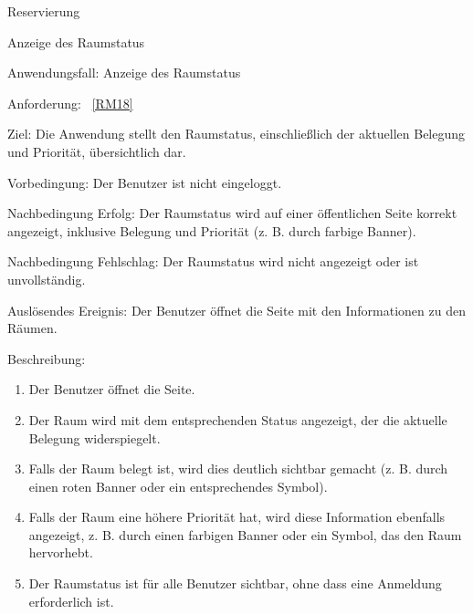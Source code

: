 \begin{function}{20}{Reservierung}
\begin{function}{70}{Anzeige des Raumstatus}
    \item[Anwendungsfall:] Anzeige des Raumstatus
    \item[Anforderung:] ~\ref{RM18}
    \item[Ziel:] Die Anwendung stellt den Raumstatus, einschließlich der aktuellen Belegung und Priorität, übersichtlich dar.
    \item[Vorbedingung:] Der Benutzer ist nicht eingeloggt.
    \item[Nachbedingung Erfolg:] Der Raumstatus wird auf einer öffentlichen Seite korrekt angezeigt, inklusive Belegung und Priorität (z. B. durch farbige Banner).
    \item[Nachbedingung Fehlschlag:] Der Raumstatus wird nicht angezeigt oder ist unvollständig.
    \item[Auslösendes Ereignis:] Der Benutzer öffnet die Seite mit den Informationen zu den Räumen.
    \item[Beschreibung:] ~
    \begin{enumerate}
        \item Der Benutzer öffnet die Seite.
        \item Der Raum wird mit dem entsprechenden Status angezeigt, der die aktuelle Belegung widerspiegelt.
        \item Falls der Raum belegt ist, wird dies deutlich sichtbar gemacht (z. B. durch einen roten Banner oder ein entsprechendes Symbol).
        \item Falls der Raum eine höhere Priorität hat, wird diese Information ebenfalls angezeigt, z. B. durch einen farbigen Banner oder ein Symbol, das den Raum hervorhebt.
        \item Der Raumstatus ist für alle Benutzer sichtbar, ohne dass eine Anmeldung erforderlich ist.
    \end{enumerate}
\end{function}


\end{function}
